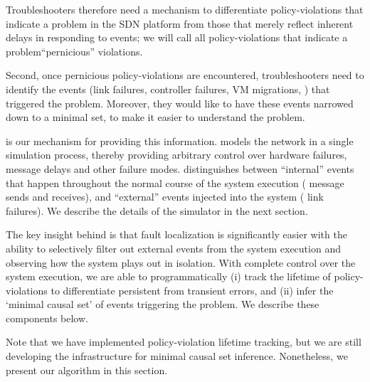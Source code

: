 Troubleshooters therefore need a mechanism to differentiate
policy-violations that indicate a problem in the SDN platform from those that merely reflect inherent delays in responding to events; we will call all policy-violations that indicate a problem``pernicious'' violations.

Second, once pernicious policy-violations are encountered, troubleshooters need to
identify the events (link failures, controller failures, VM migrations,
\etc{}) that triggered the problem. Moreover, they would like to have these events narrowed down to a minimal set, to make it easier to understand the problem.

\Simulator{} is our mechanism for providing this information. \Simulator{} models
the network in a single simulation process, thereby providing arbitrary control over hardware
failures, message delays and other failure modes. \Simulator{} distinguishes
between ``internal'' events that happen throughout the normal course of the
system execution (\eg{} message sends and receives), and ``external'' events
injected into the system (\eg{} link failures). We describe the details
of the simulator in the next section.

The key insight behind
\simulator{} is that fault localization is significantly easier with the
ability to selectively filter
out external events from the system execution and observing how the system
plays out in isolation.
With complete control over the
system execution, we are able to programmatically (i) track the lifetime of
policy-violations to differentiate persistent from transient errors, and (ii)
infer the `minimal causal set' of events triggering the problem. We describe
these components below.

Note that we have implemented policy-violation lifetime tracking, but we are
still developing the infrastructure for minimal causal set inference.
Nonetheless, we present our algorithm in this section.

